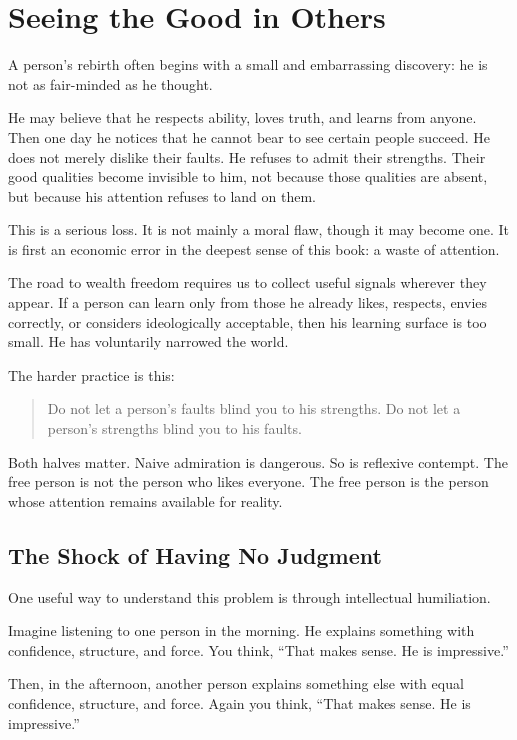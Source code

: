 \chapter{Seeing the Good in Others}

A person's rebirth often begins with a small and embarrassing discovery: he is not as fair-minded as he thought.

He may believe that he respects ability, loves truth, and learns from anyone. Then one day he notices that he cannot bear to see certain people succeed. He does not merely dislike their faults. He refuses to admit their strengths. Their good qualities become invisible to him, not because those qualities are absent, but because his attention refuses to land on them.

This is a serious loss. It is not mainly a moral flaw, though it may become one. It is first an economic error in the deepest sense of this book: a waste of attention.

The road to wealth freedom requires us to collect useful signals wherever they appear. If a person can learn only from those he already likes, respects, envies correctly, or considers ideologically acceptable, then his learning surface is too small. He has voluntarily narrowed the world.

The harder practice is this:

\begin{quote}
Do not let a person's faults blind you to his strengths. Do not let a person's strengths blind you to his faults.
\end{quote}

Both halves matter. Naive admiration is dangerous. So is reflexive contempt. The free person is not the person who likes everyone. The free person is the person whose attention remains available for reality.

\section*{The Shock of Having No Judgment}

One useful way to understand this problem is through intellectual humiliation.

Imagine listening to one person in the morning. He explains something with confidence, structure, and force. You think, ``That makes sense. He is impressive.''

Then, in the afternoon, another person explains something else with equal confidence, structure, and force. Again you think, ``That makes sense. He is impressive.''

